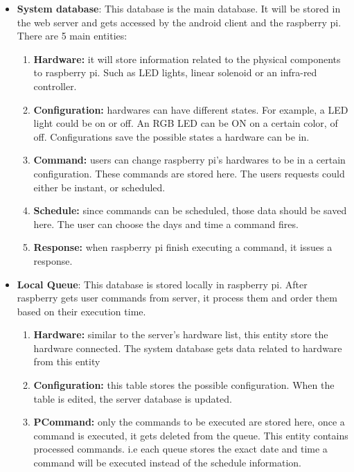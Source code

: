 \documentclass[12pt, oneside, a4paper]{book}
\newcommand\boldcolor[1]{\textcolor{bold}{\textbf{#1}}}
\begin{document}
				\begin{itemize}
					\item \boldcolor{System database}: This database is the main database. It will be stored in the web server and gets accessed by the android client and the raspberry pi. There are 5 main entities: 
					\begin{enumerate}
						\item \textbf{Hardware:} it will store information related to the physical components to raspberry pi. Such as LED lights, linear solenoid or an infra-red controller.  
						\item \textbf{Configuration:} hardwares can have different states. For example, a LED light could be on or off. An RGB LED can be ON on a certain color, of off. Configurations save the possible states a hardware can be in.
						\item \textbf{Command:} users can change raspberry pi's hardwares to be in a certain configuration. These commands are stored here. The users requests could either be instant, or scheduled. 
						\item \textbf{Schedule:} since commands can be scheduled, those data should be saved here. The user can choose the days and time a command fires.
						\item \textbf{Response:} when raspberry pi finish executing a command, it issues a response.
					\end{enumerate}
					\item \boldcolor{Local Queue}: This database is stored locally in raspberry pi. After raspberry gets user commands from server, it process them and order them based on their execution time.
					\begin{enumerate}
						\item \textbf{Hardware:} similar to the server's hardware list, this entity store the hardware connected. The system database gets data related to hardware from this entity 
						\item \textbf{Configuration:} this table stores the possible configuration. When the table is edited, the server database is updated.
						\item \textbf{PCommand:} only the commands to be executed are stored here, once a command is executed, it gets deleted from the queue. This entity contains processed commands. i.e each queue stores the exact date and time a command will be executed instead of the schedule information.
					\end{enumerate}
				\end{itemize}
			
\end{document}

